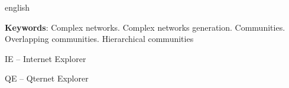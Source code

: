 \documentclass[notes.tex]{subfiles}
\begin{document}
\renewcommand{\resumoname}{Abstract}
\begin{resumoumacoluna}
 \begin{otherlanguage*}{english}
\bigskip

   \lipsum[2]

   \vspace{\onelineskip}

   \noindent
   \textbf{Keywords}: Complex networks. Complex networks generation. Communities. Overlapping communities. Hierarchical communities
 \end{otherlanguage*}
\end{resumoumacoluna}

\listoffigures*
\pagebreak

\listofquadros*
\pagebreak

\listoftables*
\pagebreak

\begin{siglas}
\item[IE] -- Internet Explorer
\item[QE] -- Qternet Explorer
\end{siglas}
\pagebreak

\tableofcontents* 
\end{document}
